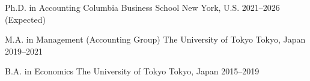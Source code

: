 

\begin{cventries}
    \cventry
    {Ph.D. in Accounting} %
    {Columbia Business School} %
    {New York, U.S.} %
    {2021--2026 (Expected)} %
    {}

    \cventry
    {M.A. in Management (Accounting Group)} %
    {The University of Tokyo} %
    {Tokyo, Japan} %
    {2019--2021} %
    {}

    \cventry
    {B.A. in Economics} %
    {The University of Tokyo} %
    {Tokyo, Japan} %
    {2015--2019} %
    {}

\end{cventries}
